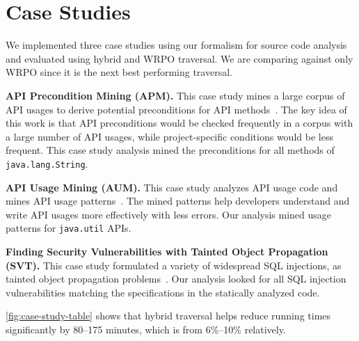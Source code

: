 \chapter{Case Studies}
\label{sec:case-studies}



We implemented three case studies using our formalism for source 
code analysis and evaluated using hybrid and WRPO traversal. We are comparing 
against only WRPO since it is the next best performing traversal. 

\textbf{API Precondition Mining (APM).} This case study mines a large corpus 
of API usages to derive potential preconditions for API methods~\cite{nguyen2014mining}. 
The key idea of this work is that API preconditions would be checked frequently in a 
corpus with a large number of API usages, while project-specific 
conditions would be less frequent. 
%
This case study analysis mined the preconditions for all methods of 
\lstinline|java.lang.String|. 

\textbf{API Usage Mining (AUM).} This case study analyzes API usage code and 
mines API usage patterns~\cite{zhong2009mapo}. The mined patterns help 
developers understand and write API usages more effectively 
with less errors. Our analysis mined usage patterns for 
\lstinline|java.util| APIs. 

\textbf{Finding Security Vulnerabilities with Tainted Object 
Propagation (SVT).} This case study formulated a variety of widespread SQL 
injections, as tainted object propagation problems~\cite{livshits2005finding}. 
Our analysis looked for all SQL injection vulnerabilities 
matching the specifications in the statically analyzed code. 

\autoref{fig:case-study-table} shows that hybrid traversal helps reduce 
running times significantly by 80--175 minutes, which is from 6\%--10\% relatively. 

%
%
